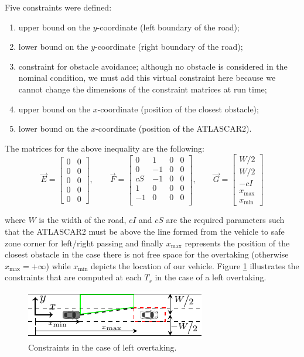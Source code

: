 Five constraints were defined:
\begin{enumerate}
	\item upper bound on the $y$-coordinate (left boundary of the road);
	\item lower bound on the $y$-coordinate (right boundary of the road);
	\item constraint for obstacle avoidance; although no obstacle is considered in the nominal condition, we must add this virtual constraint here because we cannot change the dimensions of the constraint matrices at run time;
	\item upper bound on the $x$-coordinate (position of the closest obstacle);
	\item lower bound on the $x$-coordinate (position of the ATLASCAR2).
\end{enumerate}
The matrices for the above inequality are the following:
\begin{equation}
\vec{E}= 
\begin{bmatrix}
0&0\\
0&0\\
0&0\\
0&0\\
0&0
\end{bmatrix},
\qquad
\vec{F}=\begin{bmatrix}
0&1&0&0\\
0&-1&0&0\\
cS&-1&0&0\\
1&0&0&0\\
-1&0&0&0\\
\end{bmatrix},
\qquad
\vec{G}=
\begin{bmatrix}
W/2\\W/2\\-cI\\x_{\max}\\x_{\min}
\end{bmatrix}
\end{equation}

where $W$ is the width of the road, $cI$ and $cS$ are the required parameters such that the ATLASCAR2 must be above the line formed from the vehicle to safe zone corner for left/right passing and finally $x_{\max}$ represents the position of the closest obstacle in the case there is not free space for the overtaking (otherwise $x_{\max}=+\infty$) while $x_{\min}$ depicts the location of our vehicle. Figure \ref{fig:constraint} illustrates the constraints that are computed at each $T_s$ in the case of a left overtaking.
\begin{figure}[!h]
	\centering
	\includegraphics[width=\textwidth]{./figure/constraint/constraint.pdf}
	\caption{Constraints in the case of left overtaking.}
	\label{fig:constraint}
\end{figure}

